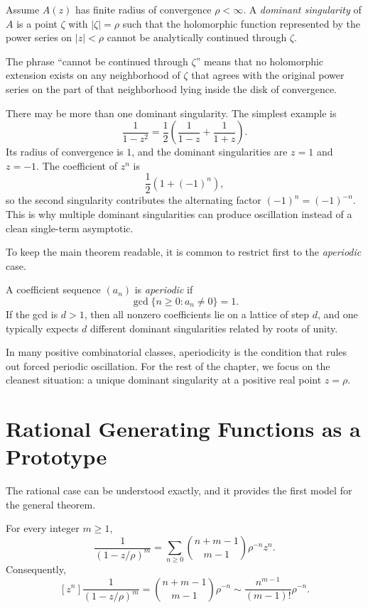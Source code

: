 \begin{definition}
Assume $A(z)$ has finite radius of convergence $\rho < \infty$. A \emph{dominant singularity} of $A$ is a point $\zeta$ with $|\zeta|=\rho$ such that the holomorphic function represented by the power series on $|z|<\rho$ cannot be analytically continued through $\zeta$.
\end{definition}

The phrase ``cannot be continued through $\zeta$'' means that no holomorphic extension exists on any neighborhood of $\zeta$ that agrees with the original power series on the part of that neighborhood lying inside the disk of convergence.

There may be more than one dominant singularity. The simplest example is
\[
  \frac{1}{1-z^2} = \frac{1}{2}\left(\frac{1}{1-z} + \frac{1}{1+z}\right).
\]
Its radius of convergence is $1$, and the dominant singularities are $z=1$ and $z=-1$. The coefficient of $z^n$ is
\[
  \frac{1}{2}(1+(-1)^n),
\]
so the second singularity contributes the alternating factor $(-1)^n = (-1)^{-n}$. This is why multiple dominant singularities can produce oscillation instead of a clean single-term asymptotic.

To keep the main theorem readable, it is common to restrict first to the \emph{aperiodic} case.

\begin{definition}
A coefficient sequence $(a_n)$ is \emph{aperiodic} if
\[
  \gcd\{n \ge 0 : a_n \ne 0\} = 1.
\]
If the gcd is $d>1$, then all nonzero coefficients lie on a lattice of step $d$, and one typically expects $d$ different dominant singularities related by roots of unity.
\end{definition}

In many positive combinatorial classes, aperiodicity is the condition that rules out forced periodic oscillation. For the rest of the chapter, we focus on the cleanest situation: a unique dominant singularity at a positive real point $z=\rho$.

\section{Rational Generating Functions as a Prototype}

The rational case can be understood exactly, and it provides the first model for the general theorem.

\begin{proposition}
For every integer $m \ge 1$,
\[
  \frac{1}{(1-z/\rho)^m} = \sum_{n \ge 0} \binom{n+m-1}{m-1}\rho^{-n} z^n.
\]
Consequently,
\[
  [z^n]\frac{1}{(1-z/\rho)^m} = \binom{n+m-1}{m-1}\rho^{-n}
  \sim \frac{n^{m-1}}{(m-1)!}\rho^{-n}.
\]
\end{proposition}

